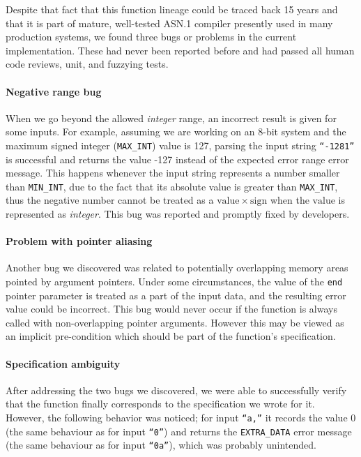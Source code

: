 \documentclass[acmsmall,nonacm]{acmart}
\begin{document}
Despite that fact that this function lineage could be traced back 15
years and that it is part of mature, well-tested ASN.1 compiler presently used
in many production systems, we
found three bugs or problems in the current implementation. These had
never been reported before and had passed all human code reviews, unit, and
fuzzying tests.
  
\paragraph{Negative range bug}

When we go beyond the allowed \textit{integer} range, an incorrect result is given
for some inputs. For example, assuming we are working on an 8-bit
system and the maximum signed integer (\texttt{MAX\_INT}) value is 127, parsing the input
string \texttt{``-1281''} is successful and returns the value -127 instead of the expected error range error message. This happens whenever the input
string represents a number smaller than \texttt{MIN\_INT}, due to the
fact that its absolute value is greater than
\texttt{MAX\_INT}, thus the negative number cannot be treated as a
$\mathrm{value}\times\mathrm{sign}$ when the $\mathrm{value}$ is
represented as \textit{integer}. This bug was reported and promptly fixed by
developers.

\paragraph{Problem with pointer aliasing}

Another bug we discovered was related to potentially overlapping
memory areas pointed by argument pointers. Under some circumstances,
the value of the \texttt{end} pointer parameter is treated as a part
of the input data, and the resulting error value could be
incorrect. This bug would never occur if the function is always called
with non-overlapping pointer arguments. However this may be viewed
as an implicit pre-condition which should be part of the function's
specification.

\paragraph{Specification ambiguity}

After addressing the two bugs we discovered, we were able to
successfully verify that the function finally corresponds to the
specification we wrote for it. However, the following
behavior was noticed; for input \texttt{``a,''} it records the value $0$ (the same behaviour
as for input \texttt{``0''}) and returns the
\texttt{EXTRA\_DATA} error message (the same behaviour as for input
\texttt{``0a''}), which was probably unintended.
  
\end{document}
